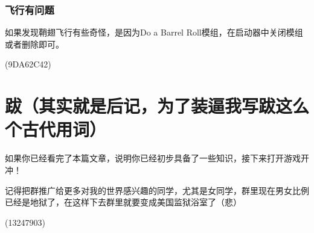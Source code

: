 \documentclass[UTF8,a4paper]{article}
\begin{document}
			\subsubsection{飞行有问题}
				\par 如果发现鞘翅飞行有些奇怪，是因为Do a Barrel Roll模组，在启动器中关闭模组或者删除即可。
				\begin{flushright}(9DA62C42)\end{flushright}
    	\section{跋（其实就是后记，为了装逼我写跋这么个古代用词）}
			\par 如果你已经看完了本篇文章，说明你已经初步具备了一些知识，接下来打开游戏开冲！
			\par 记得把群推广给更多对我的世界感兴趣的同学，尤其是女同学，群里现在男女比例已经是地狱了，在这样下去群里就要变成美国监狱浴室了（悲）
			\begin{flushright}(13247903)\end{flushright}
\end{document}

